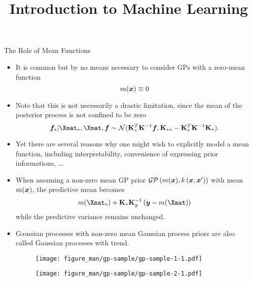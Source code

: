 




\newcommand{\titlefigure}{figure_man/gp-sample/gp-sample-2-4.pdf} %
\newcommand{\learninggoals}{
  \item Trends can be modeled via specification of the mean function 
}

\title{Introduction to Machine Learning}
\date{}





\begin{vbframe}{The Role of Mean Functions}

\begin{itemize}
  \item It is common but by no means necessary to consider GPs with a zero-mean function 
  $$
    m(\bm{x}) \equiv 0
  $$
  \item Note that this is not necessarily a drastic limitation, since the mean of the posterior process is not confined to be zero 
  $$
    \bm{f}_* | \Xmat_*, \Xmat, \bm{f} \sim \mathcal{N}(\Kmat_{*}^{T}\Kmat^{-1}\bm{f}, \Kmat_{**} - \Kmat_*^T \Kmat ^{-1}\Kmat_*).
  $$
  \item Yet there are several reasons why one might wish to explicitly model a mean function, including interpretability, convenience of expressing prior informations, ... 
  \item When assuming a non-zero mean GP prior $\mathcal{GP}\left(m(\bm{x}), k\left(\bm{x}, \bm{x}^{\prime} \right) \right)$ with mean $m(\bm{x})$, the predictive mean becomes 
  $$
    m(\Xmat_*) + \Kmat_*\Kmat_y^{-1}\left(\bm{y} - m(\Xmat)\right)
  $$
  while the predictive variance remains unchanged. 
  
  \framebreak
  
  \item Gaussian processes with non-zero mean Gaussian process priors are also called Gaussian processes with trend.  
\vspace{.3cm}

\begin{figure}
\texttt{[image: figure\_man/gp-sample/gp-sample-1-1.pdf]}
\end{figure}

\framebreak


\begin{figure}
\texttt{[image: figure\_man/gp-sample/gp-sample-2-1.pdf]}
\end{figure}


\end{itemize}
\end{vbframe}

